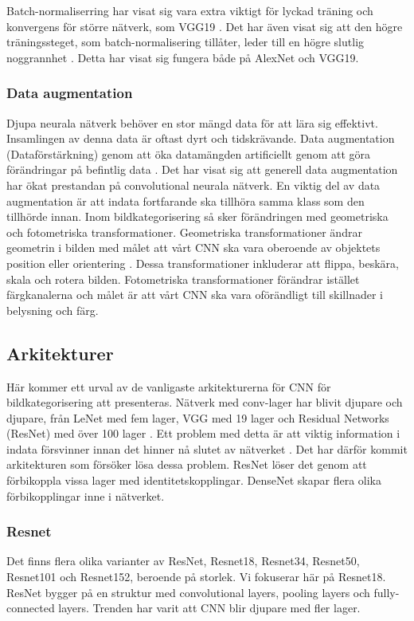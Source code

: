 \documentclass[]{kththesis}
\begin{document}
Batch-normaliserring har visat sig vara extra viktigt för lyckad träning och konvergens för större nätverk, som VGG19 \parencite{simon2016imagenet}. Det har även visat sig att den högre träningssteget, som batch-normalisering tillåter, leder till en högre slutlig noggrannhet \parencite{simon2016imagenet}. Detta har visat sig fungera både på AlexNet och VGG19.

\subsubsection{Data augmentation}
Djupa neurala nätverk behöver en stor mängd data för att lära sig effektivt. Insamlingen av denna data är oftast dyrt och tidskrävande. Data augmentation (Dataförstärkning) genom att öka datamängden artificiellt genom att göra förändringar på befintlig data \parencite{taylor2017improving}. Det har visat sig att generell data augmentation har ökat prestandan på convolutional neurala nätverk. En viktig del av data augmentation är att indata fortfarande ska tillhöra samma klass som den tillhörde innan. Inom bildkategorisering så sker förändringen med geometriska och fotometriska transformationer. Geometriska transformationer ändrar geometrin i bilden med målet att vårt CNN ska vara oberoende av objektets position eller orientering \parencite{taylor2017improving}. Dessa transformationer inkluderar att flippa, beskära, skala och rotera bilden. Fotometriska transformationer förändrar istället färgkanalerna och målet är att vårt CNN ska vara oförändligt till skillnader i belysning och färg. 

\subsection{Arkitekturer}
Här kommer ett urval av de vanligaste arkitekturerna för CNN för bildkategorisering att presenteras. Nätverk med conv-lager har blivit djupare och djupare, från LeNet \parencite{lecun1998gradient} med fem lager, VGG med 19 lager \parencite{simonyan2014very} och Residual Networks (ResNet) med över 100 lager \parencite{he2016deep}. Ett problem med detta är att viktig information i indata försvinner innan det hinner nå slutet av nätverket \parencite{huang2017densely}. Det har därför kommit arkitekturen som försöker lösa dessa problem. ResNet löser det genom att förbikoppla vissa lager med identitetskopplingar. DenseNet skapar flera olika förbikopplingar inne i nätverket.

\subsubsection{Resnet}
Det finns flera olika varianter av ResNet, Resnet18, Resnet34, Resnet50, Resnet101 och Resnet152, beroende på storlek. Vi fokuserar här på Resnet18. ResNet bygger på en struktur med convolutional layers, pooling layers och fully-connected layers. Trenden har varit att CNN blir djupare med fler lager.
\end{document}
